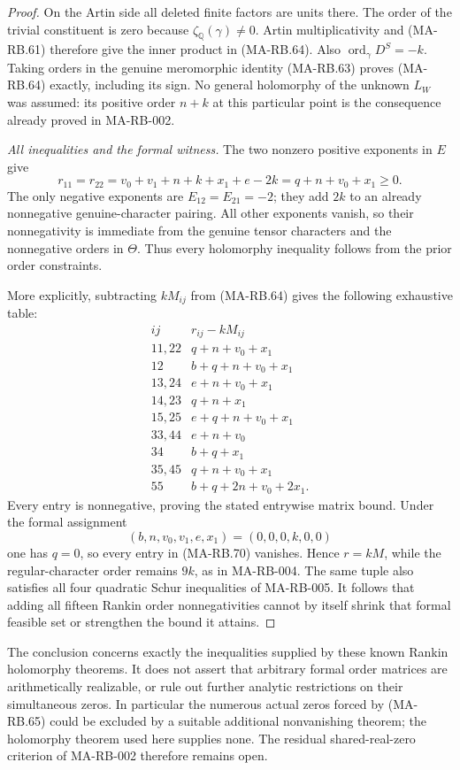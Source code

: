 \begin{proof}
On the Artin side all deleted finite factors are
units there. The order of the trivial constituent
is zero because \(\zeta_{\mathbb Q}(\gamma)\ne0\).
Artin multiplicativity and (MA-RB.61) therefore give
the inner product in (MA-RB.64). Also
\(\operatorname{ord}_\gamma D^S=-k\). Taking orders
in the genuine meromorphic identity (MA-RB.63)
proves (MA-RB.64) exactly, including its sign.
No general holomorphy of the unknown \(L_W\) was
assumed: its positive order \(n+k\) at this particular
point is the consequence already proved in MA-RB-002.

\emph{All inequalities and the formal witness.}
The two nonzero positive exponents in \(E\) give
\[
 r_{11}=r_{22}
     =v_0+v_1+n+k+x_1+e-2k
     =q+n+v_0+x_1\ge0 .
 \tag{MA-RB.69}
\]
The only negative exponents are \(E_{12}=E_{21}=-2\);
they add \(2k\) to an already nonnegative genuine-character
pairing. All other exponents vanish, so their
nonnegativity is immediate from the genuine tensor
characters and the nonnegative orders in \(\Theta\).
Thus every holomorphy inequality follows from the
prior order constraints.

More explicitly, subtracting \(kM_{ij}\) from
(MA-RB.64) gives the following exhaustive table:
\[
 \begin{array}{c|l}
 ij&r_{ij}-kM_{ij}\\ \hline
 11,22&q+n+v_0+x_1\\
 12&b+q+n+v_0+x_1\\
 13,24&e+n+v_0+x_1\\
 14,23&q+n+x_1\\
 15,25&e+q+n+v_0+x_1\\
 33,44&e+n+v_0\\
 34&b+q+x_1\\
 35,45&q+n+v_0+x_1\\
 55&b+q+2n+v_0+2x_1 .
 \end{array}
 \tag{MA-RB.70}
\]
Every entry is nonnegative, proving the stated
entrywise matrix bound. Under the formal assignment
\[
        (b,n,v_0,v_1,e,x_1)=(0,0,0,k,0,0)
\]
one has \(q=0\), so every entry in (MA-RB.70)
vanishes. Hence \(r=kM\), while the regular-character
order remains \(9k\), as in MA-RB-004.
The same tuple also satisfies all four quadratic
Schur inequalities of MA-RB-005. It follows that
adding all fifteen Rankin order nonnegativities
cannot by itself shrink that formal feasible set
or strengthen the bound it attains.
\end{proof}

The conclusion concerns exactly the inequalities supplied
by these known Rankin holomorphy theorems. It does not
assert that arbitrary formal order matrices are
arithmetically realizable, or rule out further analytic
restrictions on their simultaneous zeros. In particular
the numerous actual zeros forced by (MA-RB.65) could be
excluded by a suitable additional nonvanishing theorem;
the holomorphy theorem used here supplies none.
The residual shared-real-zero criterion of MA-RB-002
therefore remains open.

